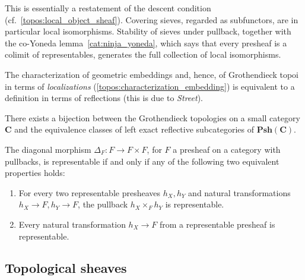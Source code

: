    \begin{remark}
        This is essentially a restatement of the descent condition (cf.~\ref{topos:local_object_sheaf}). Covering sieves, regarded as subfunctors, are in particular local isomorphisms. Stability of sieves under pullback, together with the co-Yoneda lemma~\ref{cat:ninja_yoneda}, which says that every presheaf is a colimit of representables, generates the full collection of local isomorphisms.
    \end{remark}

    The characterization of geometric embeddings and, hence, of Grothendieck topoi in terms of \textit{localizations} (\cref{topos:characterization_embedding}) is equivalent to a definition in terms of reflections (this is due to \textit{Street}).
    \begin{result}
        There exists a bijection between the Grothendieck topologies on a small category $\mathbf{C}$ and the equivalence classes of left exact reflective subcategories of $\mathbf{Psh(C)}$.
    \end{result}


    \begin{property}[Diagonals]\label{topos:representable_diagonal}
        The diagonal morphism $\Delta_F:F\rightarrow F\times F$, for $F$ a presheaf on a category with pullbacks, is representable if and only if any of the following two equivalent properties holds:
        \begin{enumerate}
            \item For every two representable presheaves $h_X,h_Y$ and natural transformations $h_X\rightarrow F,h_Y\rightarrow F$, the pullback $h_X\times_Fh_Y$ is representable.
            \item Every natural transformation $h_X\rightarrow F$ from a representable presheaf is representable.
        \end{enumerate}
    \end{property}

\subsection{Topological sheaves}

